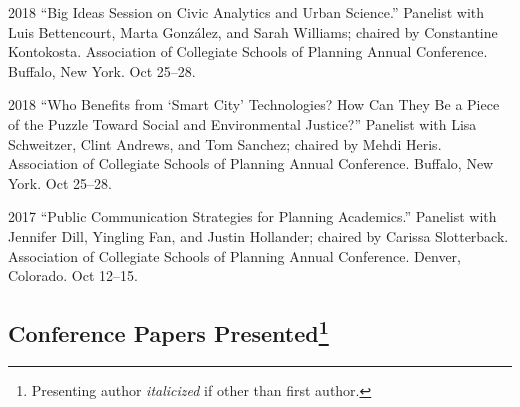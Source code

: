 \documentclass[11pt,letterpaper]{report} %
\begin{document}
\begin{tablist}
        \item[2018] \tab{}\enquote{Big Ideas Session on Civic Analytics and Urban Science.} Panelist with Luis Bettencourt, Marta Gonz{\'a}lez, and Sarah Williams; chaired by Constantine Kontokosta. Association of Collegiate Schools of Planning Annual Conference. Buffalo, New York. Oct 25--28.

        \item[2018] \tab{}\enquote{Who Benefits from \enquote{Smart City} Technologies? How Can They Be a Piece of the Puzzle Toward Social and Environmental Justice?} Panelist with Lisa Schweitzer, Clint Andrews, and Tom Sanchez; chaired by Mehdi Heris. Association of Collegiate Schools of Planning Annual Conference. Buffalo, New York. Oct 25--28.

        \item[2017] \tab{}\enquote{Public Communication Strategies for Planning Academics.} Panelist with Jennifer Dill, Yingling Fan, and Justin Hollander; chaired by Carissa Slotterback. Association of Collegiate Schools of Planning Annual Conference. Denver, Colorado. Oct 12--15.

    \end{tablist}

    \subsection*{Conference Papers Presented\footnote{Presenting author \textit{italicized} if other than first author.}}
\end{document}
